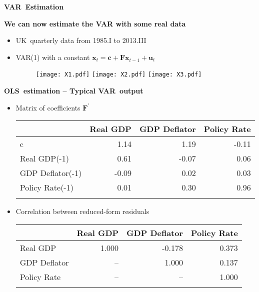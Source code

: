\documentclass[10pt,handout]{beamer}
\begin{document}
\begin{frame}
\color{title} \centering \Large%
\textbf{VAR\ Estimation}
\end{frame}

\vspace{.1cm}

\begin{frame}
{\textbf{We can now estimate the VAR with some real data}}

\begin{itemize}
\item UK\ quarterly data from 1985.I to 2013.III\medskip 

\item VAR(1) with a constant $\mathbf{x}_{t}=\mathbf{c}+\mathbf{Fx}_{t-1}+%
\mathbf{u}_{t}$\bigskip 
\begin{figure}[h]
\centering
\texttt{[image: X1.pdf]} \texttt{[image: X2.pdf]} \texttt{[image: X3.pdf]}
\end{figure}
\end{itemize}
\end{frame}

\vspace{.1cm}

\begin{frame}
{\textbf{OLS\ estimation -- Typical VAR\ output}}

\begin{itemize}
\item Matrix of coefficients $\mathbf{F}^{\prime }$%
\begin{table}[tbph]
{\footnotesize \centering 
\begin{tabular}{lrrr}
\addlinespace \toprule & Real GDP & GDP Deflator & Policy Rate \\ 
\midrule c & 1.14 & 1.19 & -0.11 \\ 
Real GDP(-1) & 0.61 & -0.07 & 0.06 \\ 
GDP Deflator(-1) & -0.09 & 0.02 & 0.03 \\ 
Policy Rate(-1) & 0.01 & 0.30 & 0.96 \\ 
\bottomrule &  &  & 
\end{tabular}%
}
\end{table}

\item Correlation between reduced-form residuals 
\begin{table}[tbph]
{\footnotesize \centering 
\begin{tabular}{lrrr}
\addlinespace \toprule & Real GDP & GDP Deflator & Policy Rate \\ 
\midrule Real GDP & 1.000 & -0.178 & 0.373 \\ 
GDP Deflator & -- & 1.000 & 0.137 \\ 
Policy Rate & -- & -- & 1.000 \\ 
\bottomrule &  &  & 
\end{tabular}%
}
\end{table}
\end{itemize}
\end{frame}
\end{document}

